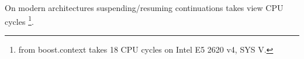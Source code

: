 
On modern architectures suspending/resuming continuations takes view CPU cycles
\footnote{ from boost.context takes 18 CPU cycles on Intel E5 2620 v4,
SYS V.}.
